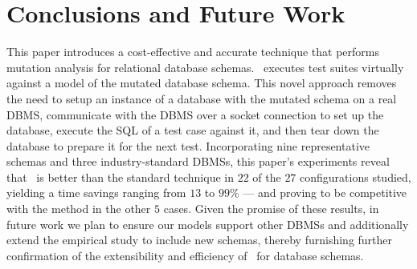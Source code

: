 
\vspace*{-.5em}

\section{Conclusions and Future Work}
\label{sec:conclusions}


This paper introduces a cost-effective and accurate technique that performs mutation analysis for relational database schemas. \Vma~executes test suites virtually against a model of the mutated database schema. This novel approach removes the need to setup an instance of a database with the mutated schema on a real DBMS, communicate with the DBMS over a socket connection to set up the database, execute the SQL \INSERTs of a test case against it, and then tear down the database to prepare it for the next test. Incorporating nine representative schemas and three industry-standard DBMSs, this paper's experiments reveal that \vma~is better than the standard technique in $22$ of the $27$ configurations studied, yielding a time savings ranging from $13$ to $99\%$ --- and proving to be competitive with the \Original method in the other $5$ cases.  Given the promise of these results, in future work we plan to ensure our models support other DBMSs and additionally extend the empirical study to include new schemas, thereby furnishing further confirmation of the extensibility and efficiency of \vma~for database schemas.

